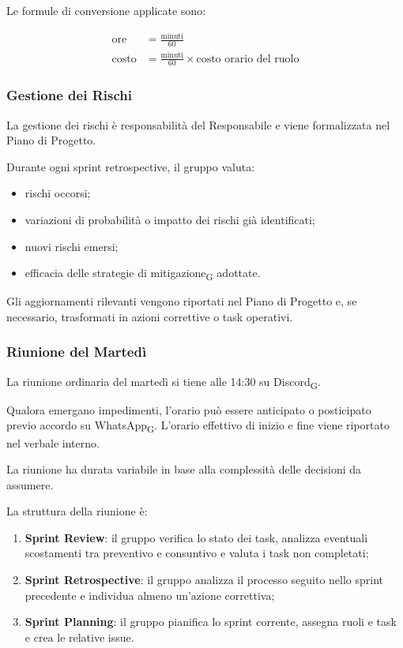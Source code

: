 Le formule di conversione applicate sono:

\begin{align*}
  \text{ore} &= \frac{\text{minuti}}{60} \\
  \text{costo} &= \frac{\text{minuti}}{60} \times \text{costo orario del ruolo}
\end{align*}

\subsubsection{Gestione dei Rischi}

La gestione dei rischi è responsabilità del Responsabile e viene formalizzata nel
Piano di Progetto.

Durante ogni sprint retrospective, il gruppo valuta:
\begin{itemize}
    \item rischi occorsi;
    \item variazioni di probabilità o impatto dei rischi già identificati;
    \item nuovi rischi emersi;
    \item efficacia delle strategie di mitigazione\textsubscript{G} adottate.
\end{itemize}

Gli aggiornamenti rilevanti vengono riportati nel Piano di Progetto e, se
necessario, trasformati in azioni correttive o task operativi.


\subsubsection{Riunione del Martedì}

La riunione ordinaria del martedì si tiene alle 14:30 su Discord\textsubscript{G}.

Qualora emergano impedimenti, l'orario può essere anticipato o posticipato previo
accordo su WhatsApp\textsubscript{G}. L'orario effettivo di inizio e fine viene
riportato nel verbale interno.

La riunione ha durata variabile in base
alla complessità delle decisioni da assumere.

La struttura della riunione è:

\begin{enumerate}
    \item \textbf{Sprint Review}: il gruppo verifica lo stato dei task, analizza
    eventuali scostamenti tra preventivo e consuntivo e valuta i task non completati;

    \item \textbf{Sprint Retrospective}: il gruppo analizza il processo seguito nello
    sprint precedente e individua almeno un'azione correttiva;

    \item \textbf{Sprint Planning}: il gruppo pianifica lo sprint corrente, assegna
    ruoli e task e crea le relative issue.
\end{enumerate}


